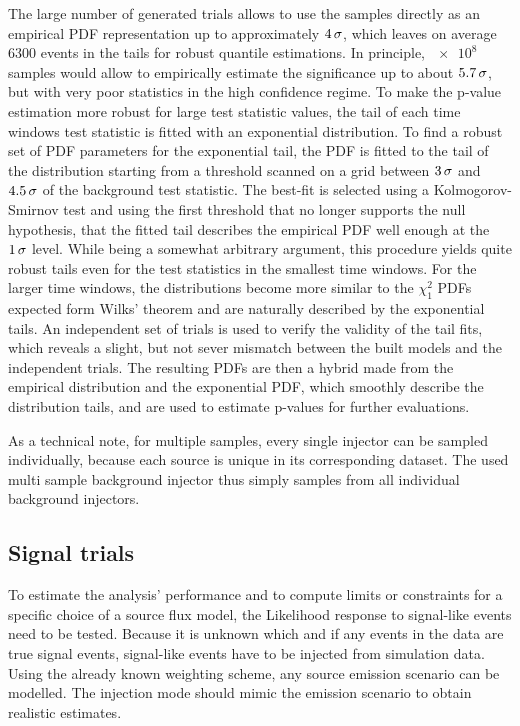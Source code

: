 The large number of generated trials allows to use the samples directly as an empirical PDF representation up to approximately $\num{4}\,\sigma$, which leaves on average $\num{6300}$ events in the tails for robust quantile estimations.
In principle, $\num{e8}$ samples would allow to empirically estimate the significance up to about $\num{5.7}\,\sigma$, but with very poor statistics in the high confidence regime.
To make the p-value estimation more robust for large test statistic values, the tail of each time windows test statistic is fitted with an exponential distribution.
To find a robust set of PDF parameters for the exponential tail, the PDF is fitted to the tail of the distribution starting from a threshold scanned on a grid between $\num{3}\,\sigma$ and $\num{4.5}\,\sigma$ of the background test statistic.
The best-fit is selected using a Kolmogorov-Smirnov test \cite{Horn:1977KSTest} and using the first threshold that no longer supports the null hypothesis, that the fitted tail describes the empirical PDF well enough at the $\num{1}\,\sigma$ level.
While being a somewhat arbitrary argument, this procedure yields quite robust tails even for the test statistics in the smallest time windows.
For the larger time windows, the distributions become more similar to the $\chi^2_1$ PDFs expected form Wilks' theorem and are naturally described by the exponential tails.
An independent set of trials is used to verify the validity of the tail fits, which reveals a slight, but not sever mismatch between the built models and the independent trials.
The resulting PDFs are then a hybrid made from the empirical distribution and the exponential PDF, which smoothly describe the distribution tails, and are used to estimate p-values for further evaluations.

As a technical note, for multiple samples, every single injector can be sampled individually, because each source is unique in its corresponding dataset.
The used multi sample background injector thus simply samples from all individual background injectors.

\subsection*{Signal trials}
To estimate the analysis' performance and to compute limits or constraints for a specific choice of a source flux model, the Likelihood response to signal-like events need to be tested.
Because it is unknown which and if any events in the data are true signal events, signal-like events have to be injected from simulation data.
Using the already known weighting scheme, any source emission scenario can be modelled.
The injection mode should mimic the emission scenario to obtain realistic estimates.

